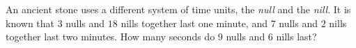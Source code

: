 An ancient stone uses a different system of time units, the \emph{null} and the \emph{nill}. It is known that $3$ nulls and $18$ nills together last one minute, and $7$ nulls and $2$ nills together last two minutes. How many seconds do $9$ nulls and $6$ nills last?

